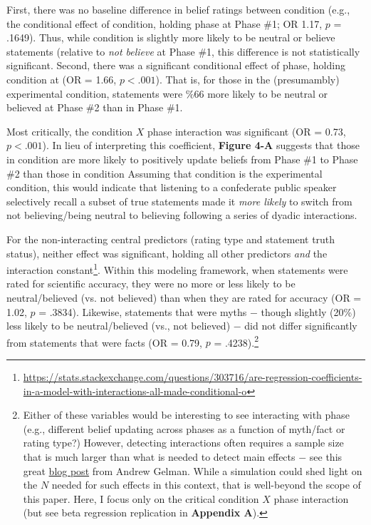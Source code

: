 \documentclass[12pt]{article}  %
\begin{document}
First, there was no baseline difference in belief ratings between condition (e.g., the conditional effect of condition, holding phase at Phase \#1; OR 1.17, $p$ = .1649). Thus, while condition  is slightly more likely to be neutral or believe statements (relative to \textit{not believe} at Phase \#1, this difference is not statistically significant. Second, there was a significant conditional effect of phase, holding condition at  (OR = 1.66, $p < .001$). That is, for those in the (presumambly) experimental condition, statements were \%66 more likely to be neutral or believed at Phase \#2 than in Phase \#1. 

Most critically, the condition $X$ phase interaction was significant (OR = 0.73, $p < .001$). In lieu of interpreting this coefficient, \textbf{Figure 4-A} suggests that those in condition  are more likely to positively update beliefs from Phase \#1 to Phase \#2 than those in condition  Assuming that condition  is the experimental condition, this would indicate that listening to a confederate public speaker selectively recall a subset of true statements made it \textit{more likely} to switch from not believing/being neutral to believing following a series of dyadic interactions.

For the non-interacting central predictors (rating type and statement truth status), neither effect was significant, holding all other predictors \textit{and} the interaction constant\footnote{\href{https://stats.stackexchange.com/questions/303716/are-regression-coefficients-in-a-model-with-interactions-all-made-conditional-o}{https://stats.stackexchange.com/questions/303716/are-regression-coefficients-in-a-model-with-interactions-all-made-conditional-o}}. Within this modeling framework, when statements were rated for scientific accuracy, they were no more or less likely to be neutral/believed (vs. not believed) than when they are rated for accuracy (OR = 1.02, $p$ = .3834). Likewise, statements that were myths $-$ though slightly (20\%) less likely to be neutral/believed (vs., not believed) $-$ did not differ significantly from statements that were facts (OR = 0.79, $p$ = .4238).\footnote{Either of these variables would be interesting to see interacting with phase (e.g., different belief updating across phases as a function of myth/fact or rating type?) However, detecting interactions often requires a sample size that is much larger than what is needed to detect main effects $-$ see this great \href{https://statmodeling.stat.columbia.edu/2018/03/15/need-16-times-sample-size-estimate-interaction-estimate-main-effect/}{blog post} from Andrew Gelman. While a simulation could shed light on the $N$ needed for such effects in this context, that is well-beyond the scope of this paper. Here, I focus only on the critical condition $X$ phase interaction (but see beta regression replication in \textbf{Appendix A}).} 
\end{document}
